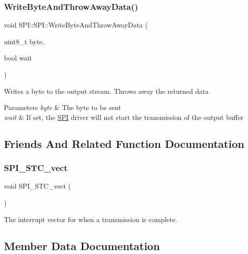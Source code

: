 \subsubsection{\texorpdfstring{Write\+Byte\+And\+Throw\+Away\+Data()}{WriteByteAndThrowAwayData()}}
{\footnotesize\ttfamily void S\+P\+I\+::\+S\+P\+I\+::\+Write\+Byte\+And\+Throw\+Away\+Data (\begin{DoxyParamCaption}\item[{uint8\+\_\+t}]{byte,  }\item[{bool}]{wait }\end{DoxyParamCaption})}

Writes a byte to the output stream. Throws away the returned data 
\begin{DoxyParams}{Parameters}
{\em byte} & The byte to be sent \\
\hline
{\em wait} & If set, the \hyperlink{class_s_p_i_1_1_s_p_i}{S\+PI} driver will not start the transmission of the output buffer \\
\hline
\end{DoxyParams}


\subsection{Friends And Related Function Documentation}
\hypertarget{class_s_p_i_1_1_s_p_i_a96543550133e0b0c6ae83faad5c0d68d}{}\label{class_s_p_i_1_1_s_p_i_a96543550133e0b0c6ae83faad5c0d68d} 
\subsubsection{\texorpdfstring{S\+P\+I\+\_\+\+S\+T\+C\+\_\+vect}{SPI\_STC\_vect}}
{\footnotesize\ttfamily void S\+P\+I\+\_\+\+S\+T\+C\+\_\+vect (\begin{DoxyParamCaption}{ }\end{DoxyParamCaption})\hspace{0.3cm}{\ttfamily [friend]}}

The interrupt vector for when a transmission is complete. 

\subsection{Member Data Documentation}
\hypertarget{class_s_p_i_1_1_s_p_i_a3dc3f87f8ee3f3b5776e21fc4b72efbc}{}\label{class_s_p_i_1_1_s_p_i_a3dc3f87f8ee3f3b5776e21fc4b72efbc} 
